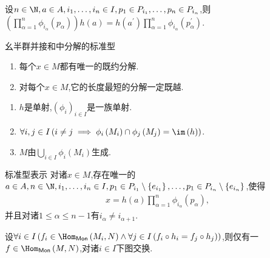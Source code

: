\begin{lemma}{}{}
	设$n\in\N,a\in A,i_{1},\ldots,i_{n}\in I,p_{1}\in P_{i_{1}},\ldots,p_{n}\in P_{i_{n}}$,则$\left(\prod\limits_{\alpha=1}^{n}\phi_{i_{\alpha}}\left(p_{\alpha}\right)\right)h\left(a\right)=h\left(a^{\prime}\right)\prod\limits_{\alpha=1}^{n}\phi_{i_{\alpha}}\left(p_{\alpha}^{\prime}\right)$.
\end{lemma}

\begin{theorem}{幺半群并接和中分解的标准型}{}
	\begin{enumerate}
		\item 每个$x\in M$都有唯一的既约分解.
		\item 对每个$x\in M$,它的长度最短的分解一定既越.
	\end{enumerate}
\end{theorem}

\begin{proposition}{}{}
	\begin{enumerate}
		\item $h$是单射,$\left(\phi_{i}\right)_{i\in I}$是一族单射.
		\item $\forall i,j\in I\left(i\neq j\implies\phi_{i}\left(M_{i}\right)\cap\phi_{j}\left(M_{j}\right)=\im\left(h\right)\right)$.
		\item $M$由$\bigcup\limits_{i\in I}\phi_{i}\left(M_{i}\right)$生成.
	\end{enumerate}
\end{proposition}

\begin{proposition}{标准型表示}{}
	对诸$x\in M$,存在唯一的$a\in A,n\in\N,i_{1},\ldots,i_{n}\in I,p_{1}\in P_{i_{1}}\setminus\left\{e_{i_{1}}\right\},\ldots,p_{1}\in P_{i_{n}}\setminus\left\{e_{i_{n}}\right\}$,使得
	\begin{align*}
		x=h\left(a\right)\prod\limits_{\alpha=1}^{n}\phi_{i_{\alpha}}\left(p_{\alpha}\right),
	\end{align*}
	并且对诸$1\leq\alpha\leq n-1$有$i_{\alpha}\neq i_{\alpha+1}$.
\end{proposition}

\begin{proposition}{}{}
	设$\forall i\in I\left(f_{i}\in\Hom_{\mathsf{Mon}}\left(M_{i},N\right)\wedge\forall j\in I\left(f_{i}\circ h_{i}=f_{j}\circ h_{j}\right)\right)$,则仅有一$f\in\Hom_{\mathsf{Mon}}\left(M,N\right)$,对诸$i\in I$下图交换.
	\begin{center}
	\end{center}
\end{proposition}

